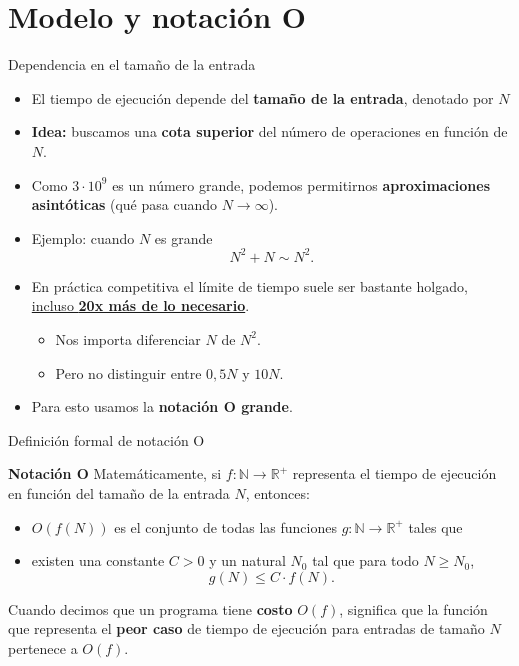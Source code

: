 \documentclass[aspectratio=169]{beamer}
\begin{document}
\section{Modelo y notación O}

\begin{frame}{Dependencia en el tamaño de la entrada}
  \begin{itemize}
    \item El tiempo de ejecución depende del \textbf{tamaño de la entrada}, denotado por \(N\)
    \item \textbf{Idea:} buscamos una \textbf{cota superior} del número de operaciones en función de \(N\).
    \item Como \(3 \cdot 10^9\) es un número grande, podemos permitirnos \textbf{aproximaciones asintóticas} (qué pasa cuando \(N \to \infty\)).
    \item Ejemplo: cuando \(N\) es grande
      \[
        N^2 + N \sim N^2.
      \]
    \item En práctica competitiva el límite de tiempo suele ser bastante holgado, \href{https://codeforces.com/contest/2109/status}{incluso \textbf{20x más de lo necesario}}.
      \begin{itemize}
        \item Nos importa diferenciar \(N\) de \(N^2\).
        \item Pero no distinguir entre \(0{,}5N\) y \(10N\).
      \end{itemize}
    \item Para esto usamos la \textbf{notación O grande}.
  \end{itemize}
\end{frame}

\begin{frame}{Definición formal de notación O}
  \begin{block}{\textbf{Notación O}}
    Matemáticamente, si \(f : \mathbb{N} \rightarrow \mathbb{R}^+\) representa el tiempo de ejecución en función del tamaño de la entrada \(N\), entonces:
    \begin{itemize}
      \item \(O(f(N))\) es el conjunto de todas las funciones \(g : \mathbb{N} \rightarrow \mathbb{R}^+\) tales que
      \item existen una constante \(C > 0\) y un natural \(N_0\) tal que para todo \(N \ge N_0\),
        \[
          g(N) \le C \cdot f(N).
        \]
    \end{itemize}
  \end{block}
  
  Cuando decimos que un programa tiene \textbf{costo} \(O(f)\), significa que la función que representa el \textbf{peor caso} de tiempo de ejecución para entradas de tamaño \(N\) pertenece a \(O(f)\).
\end{frame}
\end{document}
